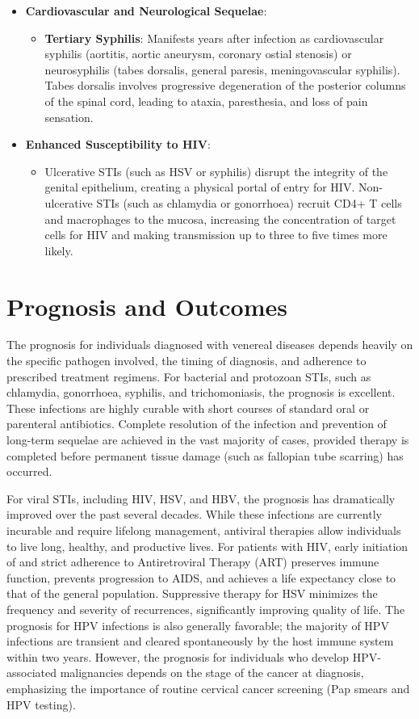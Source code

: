 \begin{itemize}
\begin{itemize}
    \end{itemize}
    \item \textbf{Cardiovascular and Neurological Sequelae}:
    \begin{itemize}
        \item \textbf{Tertiary Syphilis}: Manifests years after infection as cardiovascular syphilis (aortitis, aortic aneurysm, coronary ostial stenosis) or neurosyphilis (tabes dorsalis, general paresis, meningovascular syphilis). Tabes dorsalis involves progressive degeneration of the posterior columns of the spinal cord, leading to ataxia, paresthesia, and loss of pain sensation.
    \end{itemize}
    \item \textbf{Enhanced Susceptibility to HIV}:
    \begin{itemize}
        \item Ulcerative STIs (such as HSV or syphilis) disrupt the integrity of the genital epithelium, creating a physical portal of entry for HIV. Non-ulcerative STIs (such as chlamydia or gonorrhoea) recruit CD4+ T cells and macrophages to the mucosa, increasing the concentration of target cells for HIV and making transmission up to three to five times more likely.
    \end{itemize}
\end{itemize}

\section*{Prognosis and Outcomes}
The prognosis for individuals diagnosed with venereal diseases depends heavily on the specific pathogen involved, the timing of diagnosis, and adherence to prescribed treatment regimens. For bacterial and protozoan STIs, such as chlamydia, gonorrhoea, syphilis, and trichomoniasis, the prognosis is excellent. These infections are highly curable with short courses of standard oral or parenteral antibiotics. Complete resolution of the infection and prevention of long-term sequelae are achieved in the vast majority of cases, provided therapy is completed before permanent tissue damage (such as fallopian tube scarring) has occurred.

For viral STIs, including HIV, HSV, and HBV, the prognosis has dramatically improved over the past several decades. While these infections are currently incurable and require lifelong management, antiviral therapies allow individuals to live long, healthy, and productive lives. For patients with HIV, early initiation of and strict adherence to Antiretroviral Therapy (ART) preserves immune function, prevents progression to AIDS, and achieves a life expectancy close to that of the general population. Suppressive therapy for HSV minimizes the frequency and severity of recurrences, significantly improving quality of life. The prognosis for HPV infections is also generally favorable; the majority of HPV infections are transient and cleared spontaneously by the host immune system within two years. However, the prognosis for individuals who develop HPV-associated malignancies depends on the stage of the cancer at diagnosis, emphasizing the importance of routine cervical cancer screening (Pap smears and HPV testing).


